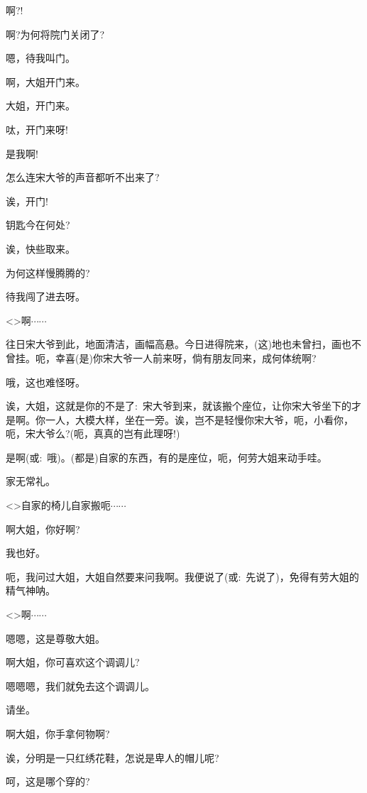 {{啊?!}


{啊?为何将院门关闭了?}

{嗯，待我叫门。}

{啊，大姐开门来。}

{大姐，开门来。}

{呔，开门来呀!}

{是我啊!}

{怎么连宋大爷的声音都听不出来了?}

{诶，开门!}

{钥匙今在何处?}

{诶，快些取来。}

{为何这样慢腾腾的?}

{待我闯了进去呀。}

{\textless{}\!\textgreater{}啊$\cdots{}\cdots{}$}

{往日宋大爷到此，地面清洁，画幅高悬。今日进得院来，(这)地也未曾扫，画也不曾挂。呃，幸喜(是)你宋大爷一人前来呀，倘有朋友同来，成何体统啊?}

{哦，这也难怪呀。}

{诶，大姐，这就是你的不是了:~宋大爷到来，就该搬个座位，让你宋大爷坐下的才是啊。你一人，大模大样，坐在一旁。诶，岂不是轻慢你宋大爷，呃，小看你，呃，宋大爷么?(呃，真真的岂有此理呀!)}

{是啊({\akai 或}:~哦)。(都是)自家的东西，有的是座位，呃，何劳大姐来动手{\footnotesize 哇}。}

{家无常礼。}

{\textless{}\!\textgreater{}自家的椅儿自家搬{\footnotesize 呃}$\cdots{}\cdots{}$}

{啊大姐，你好啊?}

{我也好。}

{呃，我问过大姐，大姐自然要来问我啊。我便说了({\akai 或}:~先说了)，免得有劳大姐的精气神{\footnotesize 呐}。}

{\textless{}\!\textgreater{}啊$\cdots{}\cdots{}$}

{嗯嗯，这是尊敬大姐。}

{啊}大姐，你可喜欢这个调调儿?

{嗯嗯嗯，我们就免去这个调调儿。}

{请坐。}

{啊大姐，你手拿何物啊?}

{诶，分明是一只红绣花鞋，怎说是卑人的帽儿呢?}

{呵，这是哪个穿的?}

}

